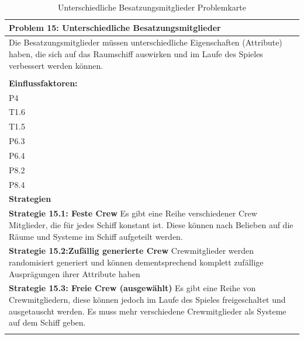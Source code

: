 \documentclass[fontsize=12pt,paper=a4,twoside]{scrartcl}
\begin{document}
\begin{table}[H]
    \centering
    \begin{tabular}{|p{15cm}|}
    \hline
          \textbf{Problem 15: Unterschiedliche Besatzungsmitglieder}  \\ \hline
	Die Besatzungsmitglieder müssen unterschiedliche Eigenschaften (Attribute) haben, die sich auf das Raumschiff auswirken und im Laufe des Spieles verbessert werden können. \\
         \\ \hline
          \textbf{Einflussfaktoren: } \\
	P4 \\
	T1.6 \\
	T1.5 \\
	P6.3 \\
	P6.4 \\
	P8.2 \\
	P8.4 \\
          \hline
          \textbf{Strategien} \\ \hline
            {}          
           \label{strategie:15.1}     
          \textbf{Strategie 15.1: Feste Crew} Es gibt eine Reihe verschiedener Crew Mitglieder, die für jedes Schiff konstant ist. Diese können nach Belieben auf die Räume und Systeme im Schiff aufgeteilt werden. \\        
  {}          
           \label{strategie:15.2}              
          \textbf{Strategie 15.2:Zufällig generierte Crew} Crewmitglieder werden randomisiert generiert und können dementsprechend komplett zufällige Ausprägungen ihrer Attribute haben  \\
	 {}          
           \label{strategie:15.3}     
          \textbf{Strategie 15.3: Freie Crew (ausgewählt)} Es gibt eine Reihe von Crewmitgliedern, diese können jedoch im Laufe des Spieles freigeschaltet und ausgetauscht werden. Es muss mehr verschiedene Crewmitglieder als Systeme auf dem Schiff geben. \\ 
	 \\ \hline
    \end{tabular}

    \caption{Unterschiedliche Besatzungsmitglieder Problemkarte}
    \label{tab:ProblemKarte15}
\end{table}
\end{document}
